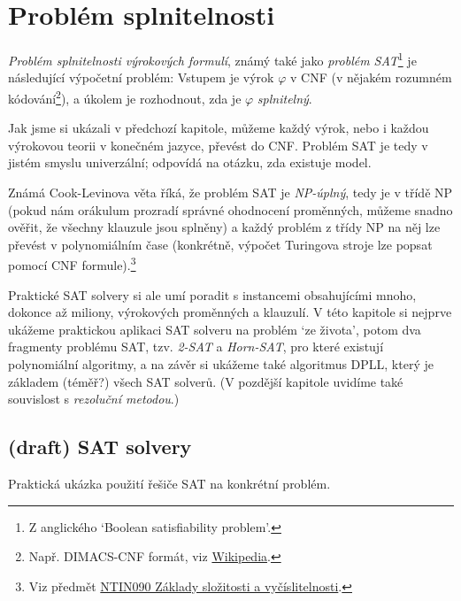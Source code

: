 \chapter{Problém splnitelnosti}

\emph{Problém splnitelnosti výrokových formulí}, známý také jako \emph{problém SAT}\footnote{Z anglického `Boolean satisfiability problem'.} je následující výpočetní problém: Vstupem je výrok $\varphi$ v CNF (v nějakém rozumném kódování\footnote{Např. DIMACS-CNF formát, viz \href{https://en.wikipedia.org/wiki/SAT_solver}{Wikipedia}.}), a úkolem je rozhodnout, zda je $\varphi$ \emph{splnitelný}.

Jak jsme si ukázali v předchozí kapitole, můžeme každý výrok, nebo i každou výrokovou teorii v konečném jazyce, převést do CNF. Problém SAT je tedy v jistém smyslu univerzální; odpovídá na otázku, zda existuje model.

Známá Cook-Levinova věta říká, že problém SAT je \emph{NP-úplný}, tedy je v třídě NP (pokud nám orákulum prozradí správné ohodnocení proměnných, můžeme snadno ověřit, že všechny klauzule jsou splněny) a každý problém z třídy NP na něj lze převést v polynomiálním čase (konkrétně, výpočet Turingova stroje lze popsat pomocí CNF formule).\footnote{Viz předmět \href{https://is.cuni.cz/studium/predmety/index.php?do=predmet&kod=NTIN090}{NTIN090 Základy složitosti a vyčíslitelnosti}.}

Praktické SAT solvery si ale umí poradit s instancemi obsahujícími mnoho, dokonce až miliony, výrokových proměnných a klauzulí. V této kapitole si nejprve ukážeme praktickou aplikaci SAT solveru na problém `ze života', potom dva fragmenty problému SAT, tzv. \emph{2-SAT} a \emph{Horn-SAT}, pro které existují polynomiální algoritmy, a na závěr si ukážeme také algoritmus DPLL, který je základem (téměř?) všech SAT solverů. (V pozdější kapitole uvidíme také souvislost s \emph{rezoluční metodou}.)


\section{(draft) SAT solvery}\todo

Praktická ukázka použití řešiče SAT na konkrétní problém.


